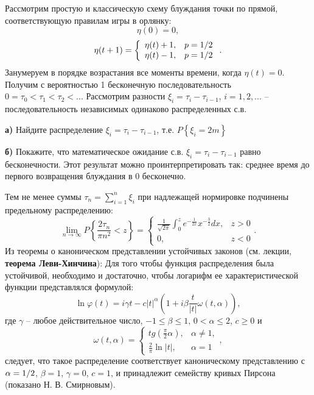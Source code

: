 \begin{problem}

Рассмотрим простую и классическую схему блуждания точки по прямой, соответствующую правилам игры в орлянку:
\[\eta (0)=0,\] 
\[\eta (t+1)=\left\{\begin{array}{cc} {\eta (t)+1,} & {p={1\mathord{\left/ {\vphantom {1 2}} \right. \kern-\nulldelimiterspace} 2} } \\ {\eta (t)-1,} & {p={1\mathord{\left/ {\vphantom {1 2}} \right. \kern-\nulldelimiterspace} 2} } \end{array}\right. .\] 
Занумеруем в порядке возрастания все моменты времени, когда $\eta (t)=0$. Получим с вероятностью 1 бесконечную последовательность $0=\tau _{0} <\tau _{1} <\tau _{2} <...$ Рассмотрим разности $\xi _{i} =\tau _{i} -\tau _{i-1} $, $i=1,2,...$ -- последовательность независимых одинаково распределенных с.в.

\textbf{а)} Найдите распределение $\xi _{i} =\tau _{i} -\tau _{i-1} $, т.е. $P\left\{\xi _{i} =2m\right\}$

\textbf{б)} Покажите, что математическое ожидание с.в. $\xi _{i} =\tau _{i} -\tau _{i-1} $ равно бесконечности. Этот результат можно проинтерпретировать так: среднее время до первого возвращения блуждания в 0 бесконечно.

Тем не менее суммы $\tau _{n} =\sum _{i=1}^{n}\xi _{i}  $ при надлежащей нормировке подчинены предельному распределению: 
\[\mathop{\lim }\limits_{n\to \infty } P\left\{\frac{2\tau _{n} }{\pi n^{2} } <z\right\}=\left\{\begin{array}{cc} {\frac{1}{\sqrt{2\pi } } \int _{0}^{z}e^{-\frac{1}{2x} } x^{-\frac{3}{2} }  dx,} & {z>0} \\ {0,} & {z<0} \end{array}\right. .\] 
Из теоремы о каноническом представлении устойчивых законов (см. лекции,\textbf{ теорема Леви-Хинчина}): Для того чтобы функция распределения была устойчивой, необходимо и достаточно, чтобы логарифм ее характеристической функции представлялся формулой:
\[\ln \varphi (t)=i\gamma t-c|t|^{\alpha } \left(1+i\beta \frac{t}{|t|} \omega (t,\alpha )\right),\] 
где $\gamma $ -- любое действительное число, $-1\le \beta \le 1$, $0<\alpha \le 2$, $c\ge 0$ и
\[\omega (t,\alpha )=\left\{\begin{array}{cc} {tg\left(\frac{\pi }{2} \alpha \right),} & {\alpha \ne 1,} \\ {\frac{2}{\pi } \ln |t|,} & {\alpha =1} \end{array}\right. ,\] 
следует, что такое распределение соответствует каноническому представлению с $\alpha ={1\mathord{\left/ {\vphantom {1 2}} \right. \kern-\nulldelimiterspace} 2} $, $\beta =1$, $\gamma =0$, $c=1$, и принадлежит семейству кривых Пирсона (показано Н. В. Смирновым).

\end{problem}

